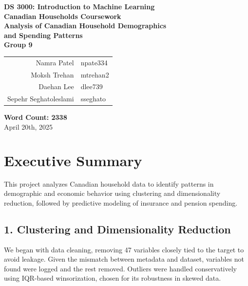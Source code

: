 \documentclass{article}
\begin{document}
\begin{titlepage}
    \centering
    \vspace*{2.5cm}
    
    {\LARGE \textbf{DS 3000: Introduction to Machine Learning}}\\[0.5cm]
    {\Large \textbf{Canadian Households Coursework}}\\[1.5cm]
    
    {\Huge \textbf{Analysis of Canadian Household Demographics \\[0.3cm] and Spending Patterns}}\\[2cm]

    {\large \textbf{Group 9}}\\[0.8cm]
    \begin{tabular}{rl}
        Namra Patel & \hspace{1cm} npate334 \\
        Moksh Trehan & \hspace{1cm} mtrehan2 \\
        Daehan Lee & \hspace{1cm} dlee739 \\
        Sepehr Seghatoleslami & \hspace{1cm} sseghato \\
    \end{tabular}
    
    \vfill
    {\large \textbf{Word Count: 2338}}\\[1.5cm]    
    {\large April 20th, 2025}
\end{titlepage}


\tableofcontents
\newpage	

\section{Executive Summary}

This project analyzes Canadian household data to identify patterns in demographic and economic behavior using clustering and dimensionality reduction, followed by predictive modeling of insurance and pension spending.

\subsection*{1. Clustering and Dimensionality Reduction}

We began with data cleaning, removing 47 variables closely tied to the target to avoid leakage. Given the mismatch between metadata and dataset, variables not found were logged and the rest removed. Outliers were handled conservatively using IQR-based winsorization, chosen for its robustness in skewed data.
\end{document}
